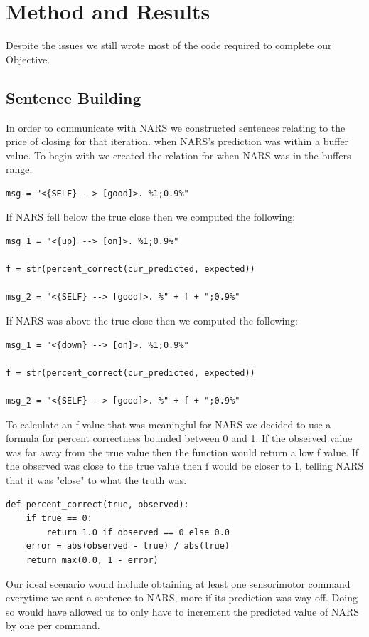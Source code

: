 \documentclass{article}
\begin{document}
\section{Method and Results}
Despite the issues we still wrote most of the code required to complete our Objective.

\subsection*{Sentence Building}
In order to communicate with NARS we constructed sentences relating to the price of closing
for that iteration. when NARS's prediction was within a buffer value. To begin with we
created the relation for when NARS was in the buffers range:

\begin{lstlisting}
msg = "<{SELF} --> [good]>. %1;0.9%"
\end{lstlisting}

If NARS fell below the true close then we computed the following:
\begin{lstlisting}
msg_1 = "<{up} --> [on]>. %1;0.9%"

f = str(percent_correct(cur_predicted, expected))

msg_2 = "<{SELF} --> [good]>. %" + f + ";0.9%"
\end{lstlisting}

If NARS was above the true close then we computed the following:
\begin{lstlisting}
msg_1 = "<{down} --> [on]>. %1;0.9%"

f = str(percent_correct(cur_predicted, expected))

msg_2 = "<{SELF} --> [good]>. %" + f + ";0.9%"
\end{lstlisting}

To calculate an f value that was meaningful for NARS we decided to use a formula for
percent correctness bounded between 0 and 1. If the observed value was far away from
the true value then the function would return a low f value. If the observed was
close to the true value then f would be closer to 1, telling NARS that it was "close"
to what the truth was.
\begin{lstlisting}[style=Pseudocode, mathescape=true]
def percent_correct(true, observed):
    if true == 0:
        return 1.0 if observed == 0 else 0.0
    error = abs(observed - true) / abs(true)
    return max(0.0, 1 - error)
\end{lstlisting}

Our ideal scenario would include obtaining at least one sensorimotor command everytime we
sent a sentence to NARS, more if its prediction was way off. Doing so would have allowed us
to only have to increment the predicted value of NARS by one per command.
\end{document}
